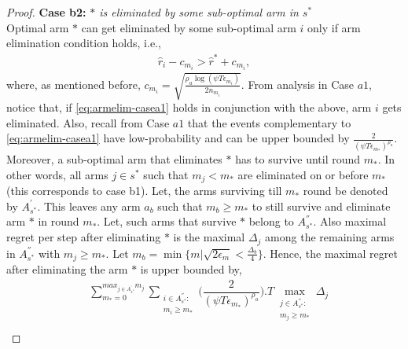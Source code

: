 \begin{proof}
 
\textbf{Case b2:} \textit{${*}$ is eliminated by some sub-optimal arm in $s^*$} \\
Optimal arm $*$ can get eliminated by some sub-optimal arm $i$ only if arm elimination condition holds, i.e., 
\begin{align*}
\hat r_{i} - c_{m_i} > \hat{r}^{*}+ c_{m_i},
\end{align*}
where, as mentioned before, $c_{m_i}  =\sqrt{\frac{\rho_{a}\log (\psi T\epsilon_{m_{i}})}{2 n_{m_i}}}$.
From analysis in Case $a1$, notice that, if \eqref{eq:armelim-casea1} holds in conjunction with the above, arm $i$ gets eliminated. Also, recall from Case $a1$ that the events complementary to \eqref{eq:armelim-casea1} have low-probability and can be upper bounded by $\frac{2}{(\psi  T\epsilon_{m_{*}})^{\rho_{a}}}$. Moreover, a sub-optimal arm that eliminates $*$ has to survive until round $m_*$. In other words, all arms ${j}\in s^{*}$ such that $m_{j} < m_{*}$ are eliminated on or before $m_*$ (this corresponds to case b1). Let, the arms surviving till $m_{*}$ round be denoted by $A^{'}_{s^{*}}$. This leaves any arm $a_{b}$ such that $m_{b}\geq m_{*} $ to still survive and eliminate arm ${*}$ in round $m_{*}$. Let, such arms that survive ${*}$ belong to $A^{''}_{s^{*}}$. Also maximal regret per step after eliminating ${*}$ is the maximal $\Delta_{j}$ among the remaining arms in $A^{''}_{s^{*}}$ with $m_{j}\geq m_{*}$.  Let $m_{b}=\min\lbrace m|\sqrt{2\epsilon_{m}}<\frac{\Delta_{b}}{4}\rbrace$. Hence, the maximal regret after eliminating the arm ${*}$ is upper bounded by, 
\begin{align*}
&\sum_{m_{*}=0}^{max_{j\in A^{'}_{s^{*}}}m_{j}}\sum_{\substack{i\in A^{''}_{s^{*}}: \\ m_{i}\geq m_{*}}}\bigg(\dfrac{2}{(\psi  T\epsilon_{m_{*}})^{\rho_{a}}} \bigg).T\max_{\substack{j\in A^{''}_{s^{*}}: \\ m_{j}\geq m_{*}}}{\Delta}_{j}\\

\end{align*}
\end{proof}
